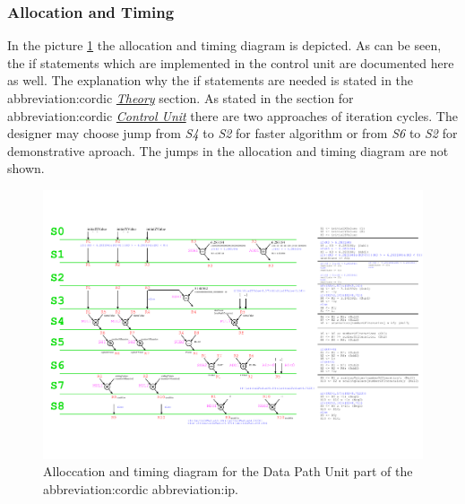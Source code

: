\documentclass[a4paper, twoside, 11pt]{article}
\newcommand{\fbar}{\FloatBarrier}
\begin{document}
        \subsubsection{Allocation and Timing}
            In the picture \ref{fig:cordic-allocation-timing} the allocation and timing diagram is depicted. As can be seen, the if statements which are implemented in the control unit are documented here as well. The explanation why the if statements are needed is stated in the \gls{abbreviation:cordic} \hyperref[subsec:cordic-theory]{\textit{Theory}} section. As stated in the section for \gls{abbreviation:cordic} \hyperref[subsubsec:cordic-control-unit]{\textit{Control Unit}} there are two approaches of iteration cycles. The designer may choose jump from \textit{S4} to \textit{S2} for faster algorithm or from \textit{S6} to \textit{S2} for demonstrative aproach. The jumps in the allocation and timing diagram are not shown.
            \begin{figure}[htbp!]
                \centering
                \includegraphics[width=1\textwidth]{src/pdf/cordic-allocation-timing.pdf}
                \caption{Alloccation and timing diagram for the Data Path Unit part of the \gls{abbreviation:cordic} \gls{abbreviation:ip}.}
                \label{fig:cordic-allocation-timing}
            \end{figure}
        \fbar
\end{document}

